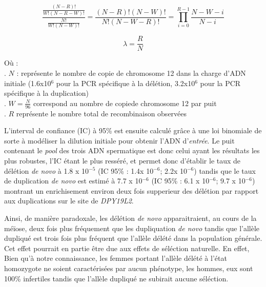 \documentclass[12pt,twoside]{reedthesis}
\begin{document}
  \begin{equation} 
  \frac{\frac{(N - R)!}{W!(N-R-W)!}}{\frac{N!}{W!(N-W)!}} = \frac{(N-R)!(N-W)!}{N!(N-W-R)!} = \prod_{i=0}^{R-1}{\frac{N-W-i}{N-i}}
  \label{eq:hypergeo}
  \end{equation}
  
  \begin{equation} 
  \lambda = \frac{R}{N}
  \label{eq:lambda}
  \end{equation}
  
  Où :\\
  . \(N\) : représente le nombre de copie de chromosome 12 dans la charge
  d'ADN initiale (1.6x10\({^6}\) pour la PCR spécifique à la délétion,
  3.2x10\({^6}\) pour la PCR spécifique à la duplication)\\
  . \(W = \frac{N}{96}\) correspond au nombre de copiede chromosome 12 par
  puit\\
  . \(R\) représente le nombre total de recombinaison observées
  
  L'interval de confiance (IC) à 95\% est ensuite calculé grâce à une loi
  binomiale de sorte à modéliser la dilution initiale pour obtenir l'ADN
  d'\emph{entrée}. Le puit contenant le \emph{pool} des trois ADN
  spermatique est donc celui ayant les résultats les plus robustes, l'IC
  étant le plus resséré, et permet donc d'établir le taux de délétion
  \emph{de novo} à 1.8 x 10\(^{-5}\) (IC 95\% : 1.4x 10\(^{-6}\); 2.2x
  10\(^{-6}\)) tandis que le taux de duplication \emph{de novo} est estimé
  à 7.7 x 10\(^{-6}\) (IC 95\% : 6.1 x 10\(^{-6}\); 9.7 x 10\(^{-6}\))
  montrant un enrichisement environ deux fois supperieur des délétion par
  rapport aux duplications sur le site de \emph{DPY19L2}.
  
  Ainsi, de manière paradoxale, les délétion \emph{de novo}
  apparaitraient, au cours de la méïose, deux fois plus fréquement que les
  dupliquation \emph{de novo} tandis que l'allèle dupliqué est trois fois
  plus fréquent que l'allèle délété dans la population générale. Cet effet
  pourrait en partie être due aux effets de séléction naturelle. En effet,
  Bien qu'à notre connaissance, les femmes portant l'allèle délété à
  l'état homozygote ne soient caractérisées par aucun phénotype, les
  hommes, eux sont 100\% infertiles tandis que l'allèle dupliqué ne
  subirait aucune séléction.
  
\end{document}
